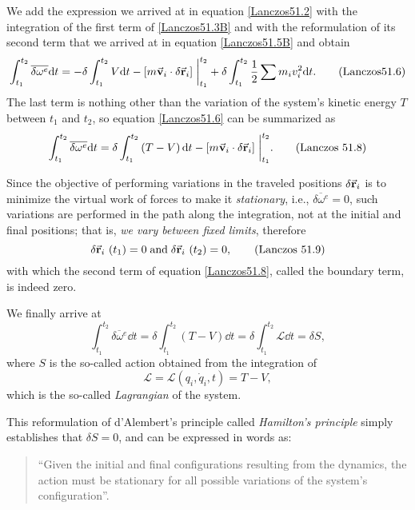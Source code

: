\documentclass[12pt, english, a4paper]{article}
\begin{document}
We add the expression we arrived at in equation \eqref{Lanczos51.2} with the integration of the first term of \eqref{Lanczos51.3B} and with the reformulation of its second term that we arrived at in equation \eqref{Lanczos51.5B} and obtain
\begin{equation}\label{Lanczos51.6}
	\int^{t_2}_{t_1} \overline{\delta \omega^e} \dd t=
	- \delta \int^{t_2}_{t_1} V \dd t 
	- \left[ m \va{v}_i \cdot \delta \va{r}_i \right]\eval^{t_2}_{t_1}
	+ \delta \int^{t_2}_{t_1} \frac{1}{2} \sum m_i v_i^2 \dd t .
	\tag{Lanczos51.6}
\end{equation}
The last term is nothing other than the variation of the system's kinetic energy \(T\) between \(t_1\) and \(t_2\), so equation \eqref{Lanczos51.6} can be summarized as
\begin{equation}\label{Lanczos51.8}
    \int^{t_2}_{t_1} \overline{\delta \omega^e} \dd t= \delta \int^{t_2}_{t_1} \left(T - V \right) \dd t - \left[ m \va{v}_i \cdot \delta \va{r}_i \right]\eval^{t_2}_{t_1}.
    \tag{Lanczos 51.8}
\end{equation}

Since the objective of performing variations in the traveled positions \(\delta \va{r}_i\) is to minimize the virtual work of forces to make it \emph{stationary}, i.e., \(\overline{\delta \omega^e}= 0\), such variations are performed in the path along the integration, not at the initial and final positions; that is, \emph{we vary between fixed limits}, therefore
\begin{equation}\label{Lanczos51.9}
	\delta \va{r}_i\ (t_1)=0 \; \text{and} \; 
	\delta \va{r}_i\ (t_2)=0,
	\tag{Lanczos 51.9}
\end{equation}
with which the second term of equation \eqref{Lanczos51.8}, called the boundary term, is indeed zero.

We finally arrive at
\begin{equation}\label{Lanczos51.10}
    \int^{t_2}_{t_1} \overline{\delta \omega^e} \dd t=
	\delta \int^{t_2}_{t_1} \left(T - V \right) \dd t= 
	\delta \int^{t_2}_{t_1} \mathcal{L} \dd t= \delta S,
    \tag{Lanczos 51.10}
\end{equation}
where \(S\) is the so-called action obtained from the integration of
\begin{equation}\label{Lanczos51.11}
	\mathcal{L} = \mathcal{L}(q_i, \dot{q}_i, t) = T - V,
    \tag{Lanczos 51.11}
\end{equation}
which is the so-called \emph{Lagrangian} of the system.

This reformulation of d'Alembert's principle called \emph{Hamilton's principle} simply establishes that \(\delta S= 0\), and can be expressed in words as:
\begin{quote}
``Given the initial and final configurations resulting from the dynamics, the action must be stationary for all possible variations of the system's configuration''. 
\end{quote}
\end{document}
